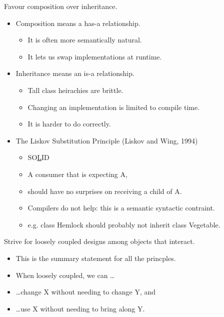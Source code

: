 \documentclass{beamer}
\begin{document}
\begin{frame}{Favour composition over inheritance.}
    \begin{itemize}
        \item Composition means a has-a relationship.
            \begin{itemize}
                \item It is often more semantically natural.
                \item It lets us swap implementations at runtime.
            \end{itemize}
        \item Inheritance means an is-a relationship.
            \begin{itemize}
                \item Tall class heirachies are brittle.
                \item Changing an implementation is limited to compile time.
                \item It is harder to do correctly.
            \end{itemize}
        \item The Liskov Substitution Principle (Liskov and Wing, 1994)
            \begin{itemize}
                \item SO\underline{L}ID %
                \item A consumer that is expecting A, 
                \item should have no surprises on receiving a child of A.
                \item Compilers do not help: this is a semantic syntactic contraint.
                \item e.g. class Hemlock should probably not inherit class Vegetable.
            \end{itemize}
    \end{itemize}
\end{frame}

\begin{frame}{Strive for loosely coupled designs among objects that interact.}
    \begin{itemize}
        \item This is the summary statement for all the princples.
        \item When loosely coupled, we can \ldots
        \item \ldots change X without needing to change Y, and
        \item \ldots use X without needing to bring along Y.
    \end{itemize}
\end{frame}
\end{document}
